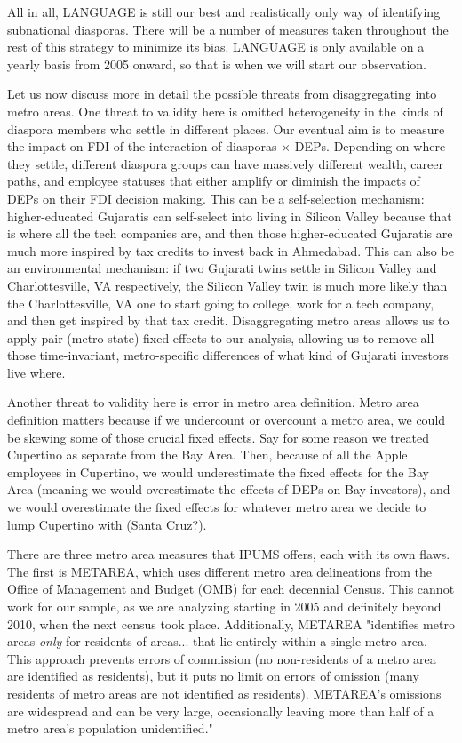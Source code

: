 \documentclass[doublespace,nopageskip]{UVAthesis}
\begin{document}
All in all, LANGUAGE is still our best and realistically only way of identifying subnational diasporas. There will be a number of measures taken throughout the rest of this strategy to minimize its bias. LANGUAGE is only available on a yearly basis from 2005 onward, so that is when we will start our observation.

Let us now discuss more in detail the possible threats from disaggregating into metro areas. One threat to validity here is omitted heterogeneity in the kinds of diaspora members who settle in different places. Our eventual aim is to measure the impact on FDI of the interaction of diasporas $\times$ DEPs. Depending on where they settle, different diaspora groups can have massively different wealth, career paths, and employee statuses that either amplify or diminish the impacts of DEPs on their FDI decision making. This can be a self-selection mechanism: higher-educated Gujaratis can self-select into living in Silicon Valley because that is where all the tech companies are, and then those higher-educated Gujaratis are much more inspired by tax credits to invest back in Ahmedabad. This can also be an environmental mechanism: if two Gujarati twins settle in Silicon Valley and Charlottesville, VA respectively, the Silicon Valley twin is much more likely than the Charlottesville, VA one to start going to college, work for a tech company, and then get inspired by that tax credit. Disaggregating metro areas allows us to apply pair (metro-state) fixed effects to our analysis, allowing us to remove all those time-invariant, metro-specific differences of what kind of Gujarati investors live where.

Another threat to validity here is error in metro area definition. Metro area definition matters because if we undercount or overcount a metro area, we could be skewing some of those crucial fixed effects. Say for some reason we treated Cupertino as separate from the Bay Area. Then, because of all the Apple employees in Cupertino, we would underestimate the fixed effects for the Bay Area (meaning we would overestimate the effects of DEPs on Bay investors), and we would overestimate the fixed effects for whatever metro area we decide to lump Cupertino with (Santa Cruz?). 

There are three metro area measures that IPUMS offers, each with its own flaws.\citep{noauthor_ipums_nodate} The first is METAREA, which uses different metro area delineations from the Office of Management and Budget (OMB) for each decennial Census. This cannot work for our sample, as we are analyzing starting in 2005 and definitely beyond 2010, when the next census took place. Additionally, METAREA "identifies metro areas \textit{only} for residents of areas... that lie entirely within a single metro area. This approach prevents errors of commission (no non-residents of a metro area are identified as residents), but it puts no limit on errors of omission (many residents of metro areas are not identified as residents). METAREA's omissions are widespread and can be very large, occasionally leaving more than half of a metro area's population unidentified." 
\end{document}
